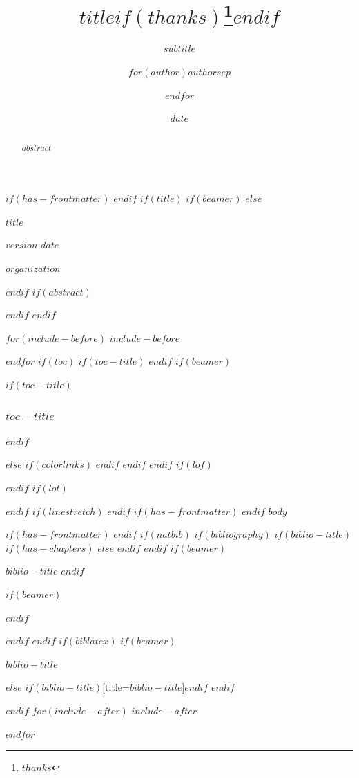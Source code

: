 \documentclass[
$if(fontsize)$
  $fontsize$,
$endif$
$if(papersize)$
  $papersize$paper,
$endif$
$if(beamer)$
  ignorenonframetext,
$if(handout)$
  handout,
$endif$
$if(aspectratio)$
  aspectratio=$aspectratio$,
$endif$
$endif$
$for(classoption)$
  $classoption$$sep$,
$endfor$
]{$documentclass$}
\title{$title$$if(thanks)$\thanks{$thanks$}$endif$}
\subtitle{$subtitle$}
\author{$for(author)$$author$$sep$ \and $endfor$}
\date{$date$}
\institute{$for(institute)$$institute$$sep$ \and $endfor$}
\newif\ifbibliography
\begin{document}
$if(has-frontmatter)$
\frontmatter
$endif$
$if(title)$
$if(beamer)$
\frame{\titlepage}
$else$
\begin{titlepage}
    \centering
    \vspace*{3cm}
    {\Huge\bfseries $title$\par}
    \vspace{1cm}
    {\Large $version$ \quad $date$\par}
    \vspace{0.5cm}
    {\Large $organization$\par}
\end{titlepage}
$endif$
$if(abstract)$
\begin{abstract}
$abstract$
\end{abstract}
$endif$
$endif$

$for(include-before)$
$include-before$

$endfor$
$if(toc)$
$if(toc-title)$
\renewcommand*\contentsname{$toc-title$}
$endif$
$if(beamer)$
\begin{frame}[allowframebreaks]
$if(toc-title)$
  \frametitle{$toc-title$}
$endif$
  \tableofcontents[hideallsubsections]
\end{frame}
$else$
{
$if(colorlinks)$
\hypersetup{linkcolor=$if(toccolor)$$toccolor$$else$$endif$}
$endif$
\setcounter{tocdepth}{$toc-depth$}
\tableofcontents
}
$endif$
$endif$
$if(lof)$
\listoffigures
$endif$
$if(lot)$
\listoftables
$endif$
$if(linestretch)$
$endif$
$if(has-frontmatter)$
\mainmatter
$endif$
$body$

$if(has-frontmatter)$
\backmatter
$endif$
$if(natbib)$
$if(bibliography)$
$if(biblio-title)$
$if(has-chapters)$
\renewcommand\bibname{$biblio-title$}
$else$
\renewcommand\refname{$biblio-title$}
$endif$
$endif$
$if(beamer)$
\begin{frame}[allowframebreaks]{$biblio-title$}
  \bibliographytrue
$endif$
  
$if(beamer)$
\end{frame}
$endif$

$endif$
$endif$
$if(biblatex)$
$if(beamer)$
\begin{frame}[allowframebreaks]{$biblio-title$}
  \bibliographytrue
  \printbibliography[heading=none]
\end{frame}
$else$
\printbibliography$if(biblio-title)$[title=$biblio-title$]$endif$
$endif$

$endif$
$for(include-after)$
$include-after$

$endfor$
\end{document}
